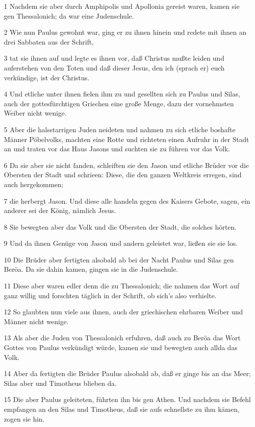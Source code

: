 \par 1 Nachdem sie aber durch Amphipolis und Apollonia gereist waren, kamen sie gen Thessalonich; da war eine Judenschule.
\par 2 Wie nun Paulus gewohnt war, ging er zu ihnen hinein und redete mit ihnen an drei Sabbaten aus der Schrift,
\par 3 tat sie ihnen auf und legte es ihnen vor, daß Christus mußte leiden und auferstehen von den Toten und daß dieser Jesus, den ich (sprach er) euch verkündige, ist der Christus.
\par 4 Und etliche unter ihnen fielen ihm zu und gesellten sich zu Paulus und Silas, auch der gottesfürchtigen Griechen eine große Menge, dazu der vornehmsten Weiber nicht wenige.
\par 5 Aber die halsstarrigen Juden neideten und nahmen zu sich etliche boshafte Männer Pöbelvolks, machten eine Rotte und richteten einen Aufruhr in der Stadt an und traten vor das Haus Jasons und suchten sie zu führen vor das Volk.
\par 6 Da sie aber sie nicht fanden, schleiften sie den Jason und etliche Brüder vor die Obersten der Stadt und schrieen: Diese, die den ganzen Weltkreis erregen, sind auch hergekommen;
\par 7 die herbergt Jason. Und diese alle handeln gegen des Kaisers Gebote, sagen, ein anderer sei der König, nämlich Jesus.
\par 8 Sie bewegten aber das Volk und die Obersten der Stadt, die solches hörten.
\par 9 Und da ihnen Genüge von Jason und andern geleistet war, ließen sie sie los.
\par 10 Die Brüder aber fertigten alsobald ab bei der Nacht Paulus und Silas gen Beröa. Da sie dahin kamen, gingen sie in die Judenschule.
\par 11 Diese aber waren edler denn die zu Thessalonich; die nahmen das Wort auf ganz willig und forschten täglich in der Schrift, ob sich's also verhielte.
\par 12 So glaubten nun viele aus ihnen, auch der griechischen ehrbaren Weiber und Männer nicht wenige.
\par 13 Als aber die Juden von Thessalonich erfuhren, daß auch zu Beröa das Wort Gottes von Paulus verkündigt würde, kamen sie und bewegten auch allda das Volk.
\par 14 Aber da fertigten die Brüder Paulus alsobald ab, daß er ginge bis an das Meer; Silas aber und Timotheus blieben da.
\par 15 Die aber Paulus geleiteten, führten ihn bis gen Athen. Und nachdem sie Befehl empfangen an den Silas und Timotheus, daß sie aufs schnellste zu ihm kämen, zogen sie hin.
